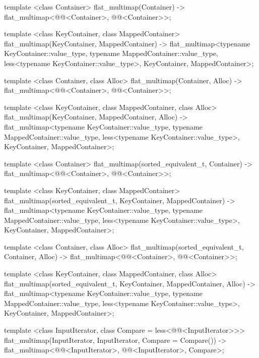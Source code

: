 \begin{codeblock}
\begin{codeblock}
\begin{codeblock}
\begin{addedblock}
\begin{codeblock}
{  template <class Container>
    flat_multimap(Container)
      -> flat_multimap<@@<Container>, @@<Container>>;

  template <class KeyContainer, class MappedContainer>
    flat_multimap(KeyContainer, MappedContainer)
      -> flat_multimap<typename KeyContainer::value_type,
                       typename MappedContainer::value_type,
                       less<typename KeyContainer::value_type>,
                       KeyContainer, MappedContainer>;

  template <class Container, class Alloc>
    flat_multimap(Container, Alloc)
      -> flat_multimap<@@<Container>, @@<Container>>;

  template <class KeyContainer, class MappedContainer, class Alloc>
    flat_multimap(KeyContainer, MappedContainer, Alloc)
      -> flat_multimap<typename KeyContainer::value_type,
                       typename MappedContainer::value_type,
                       less<typename KeyContainer::value_type>,
                       KeyContainer, MappedContainer>;

  template <class Container>
    flat_multimap(sorted_equivalent_t, Container)
      -> flat_multimap<@@<Container>, @@<Container>>;

  template <class KeyContainer, class MappedContainer>
    flat_multimap(sorted_equivalent_t, KeyContainer, MappedContainer)
      -> flat_multimap<typename KeyContainer::value_type,
                       typename MappedContainer::value_type,
                       less<typename KeyContainer::value_type>,
                       KeyContainer, MappedContainer>;

  template <class Container, class Alloc>
    flat_multimap(sorted_equivalent_t, Container, Alloc)
      -> flat_multimap<@@<Container>, @@<Container>>;

  template <class KeyContainer, class MappedContainer, class Alloc>
    flat_multimap(sorted_equivalent_t, KeyContainer, MappedContainer, Alloc)
      -> flat_multimap<typename KeyContainer::value_type,
                       typename MappedContainer::value_type,
                       less<typename KeyContainer::value_type>,
                       KeyContainer, MappedContainer>;

  template <class InputIterator, class Compare = less<@@<InputIterator>>>
    flat_multimap(InputIterator, InputIterator, Compare = Compare())
      -> flat_multimap<@@<InputIterator>, @@<InputIterator>, Compare>;

}
\end{codeblock}
\end{addedblock}
\end{codeblock}
\end{codeblock}
\end{codeblock}
